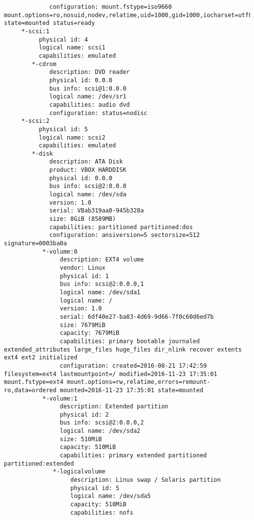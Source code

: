 {\begin{verbatim}
             configuration: mount.fstype=iso9660 mount.options=ro,nosuid,nodev,relatime,uid=1000,gid=1000,iocharset=utf8,mode=0400,dmode=0500 state=mounted status=ready
     *-scsi:1
          physical id: 4
          logical name: scsi1
          capabilities: emulated
        *-cdrom
             description: DVD reader
             physical id: 0.0.0
             bus info: scsi@1:0.0.0
             logical name: /dev/sr1
             capabilities: audio dvd
             configuration: status=nodisc
     *-scsi:2
          physical id: 5
          logical name: scsi2
          capabilities: emulated
        *-disk
             description: ATA Disk
             product: VBOX HARDDISK
             physical id: 0.0.0
             bus info: scsi@2:0.0.0
             logical name: /dev/sda
             version: 1.0
             serial: VBab319aa0-945b328a
             size: 8GiB (8589MB)
             capabilities: partitioned partitioned:dos
             configuration: ansiversion=5 sectorsize=512 signature=0003ba0a
           *-volume:0
                description: EXT4 volume
                vendor: Linux
                physical id: 1
                bus info: scsi@2:0.0.0,1
                logical name: /dev/sda1
                logical name: /
                version: 1.0
                serial: 6df40e27-ba83-4d69-9d66-7f0c60d6ed7b
                size: 7679MiB
                capacity: 7679MiB
                capabilities: primary bootable journaled extended_attributes large_files huge_files dir_nlink recover extents ext4 ext2 initialized
                configuration: created=2016-08-21 17:42:59 filesystem=ext4 lastmountpoint=/ modified=2016-11-23 17:35:01 mount.fstype=ext4 mount.options=rw,relatime,errors=remount-ro,data=ordered mounted=2016-11-23 17:35:01 state=mounted
           *-volume:1
                description: Extended partition
                physical id: 2
                bus info: scsi@2:0.0.0,2
                logical name: /dev/sda2
                size: 510MiB
                capacity: 510MiB
                capabilities: primary extended partitioned partitioned:extended
              *-logicalvolume
                   description: Linux swap / Solaris partition
                   physical id: 5
                   logical name: /dev/sda5
                   capacity: 510MiB
                   capabilities: nofs
\end{verbatim}
}